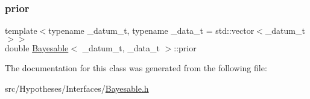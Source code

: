 \subsubsection{\texorpdfstring{prior}{prior}}
{\footnotesize\ttfamily template$<$typename \+\_\+datum\+\_\+t, typename \+\_\+data\+\_\+t = std\+::vector$<$\+\_\+datum\+\_\+t$>$$>$ \\
double \hyperlink{class_bayesable}{Bayesable}$<$ \+\_\+datum\+\_\+t, \+\_\+data\+\_\+t $>$\+::prior}



The documentation for this class was generated from the following file\+:\begin{DoxyCompactItemize}
\item 
src/\+Hypotheses/\+Interfaces/\hyperlink{_bayesable_8h}{Bayesable.\+h}\end{DoxyCompactItemize}
